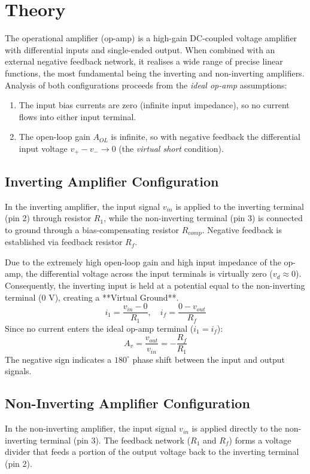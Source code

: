 \section{Theory}

The operational amplifier (op-amp) is a high-gain DC-coupled voltage amplifier with differential inputs and single-ended output. When combined with an external negative feedback network, it realises a wide range of precise linear functions, the most fundamental being the inverting and non-inverting amplifiers. Analysis of both configurations proceeds from the \emph{ideal op-amp} assumptions:
\begin{enumerate}[label=(\alph*)]
	\item The input bias currents are zero (infinite input impedance), so no current flows into either input terminal.
	\item The open-loop gain $A_{OL}$ is infinite, so with negative feedback the differential input voltage $v_+ - v_- \to 0$ (the \emph{virtual short} condition).
\end{enumerate}
\subsection{Inverting Amplifier Configuration}
In the inverting amplifier, the input signal $v_{in}$ is applied to the inverting terminal (pin 2) through resistor $R_1$, while the non-inverting terminal (pin 3) is connected to ground through a bias-compensating resistor $R_{comp}$. Negative feedback is established via feedback resistor $R_f$.

Due to the extremely high open-loop gain and high input impedance of the op-amp, the differential voltage across the input terminals is virtually zero ($v_d \approx 0$). Consequently, the inverting input is held at a potential equal to the non-inverting terminal (0 V), creating a **Virtual Ground**.
\begin{equation}
	i_1 = \frac{v_{in} - 0}{R_1}, \quad i_f = \frac{0 - v_{out}}{R_f}
\end{equation}
Since no current enters the ideal op-amp terminal ($i_1 = i_f$):
\begin{equation}
	A_v = \frac{v_{out}}{v_{in}} = -\frac{R_f}{R_1}
\end{equation}
The negative sign indicates a $180^\circ$ phase shift between the input and output signals.

\subsection{Non-Inverting Amplifier Configuration}
In the non-inverting amplifier, the input signal $v_{in}$ is applied directly to the non-inverting terminal (pin 3). The feedback network ($R_1$ and $R_f$) forms a voltage divider that feeds a portion of the output voltage back to the inverting terminal (pin 2).

